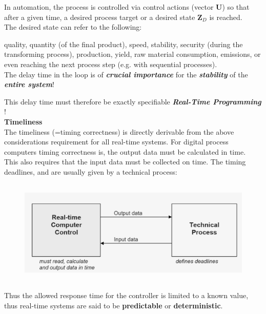 In automation, the process is controlled via control actions (vector \textbf{U}) so that after a given time, a desired process target or a desired state \textbf{Z\textit{${}_{D}$}} is reached. \\

The desired state can refer to the following:

quality, quantity (of the final product), speed, stability, security (during the transforming process), production, yield, raw material consumption, emissions, or even reaching the next process step (e.g. with sequential processes).\\

The delay time in the loop is of \textbf{\textit{crucial importance}} for the \textbf{\textit{stability}} of the \textbf{\textit{entire system}}!

This delay time must therefore be exactly specifiable  \textbf{\textit{Real-Time Programming}} !\\

{\rot\bf Timeliness}\\

The timeliness (=timing correctness) is directly derivable from the above considerations requirement for all real-time systems. For digital process computers timing correctness is, the output data must be calculated in time.\\

This also requires that the input data must be collected on time. The timing deadlines, and are usually given by a technical process:\\

\begin{figure}[h]
    \centering
    \includegraphics[width=12cm, height=5cm]{Images/image61.png}
    \label{fig:Fig 3}
\end{figure}

Thus the allowed response time for the controller is limited to a known value, thus real-time systems are said to be \textbf{predictable} or \textbf{deterministic}.\\

